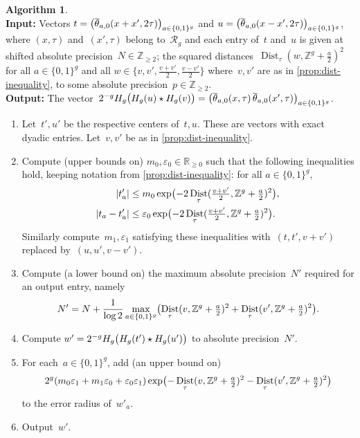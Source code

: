 \documentclass[12pt,oneside]{amsart}
\numberwithin{equation}{section}
\theoremstyle{definition}
\newtheorem{algorithm}[equation]{Algorithm}
\newcommand{\algoinput}[1]{~\\ \noindent\textbf{Input:} #1}
\newcommand{\algooutput}[1]{~\\ \noindent\textbf{Output:} #1}
\newcommand{\Z}{\mathbb{Z}}
\newcommand{\R}{\mathbb{R}}
\newcommand{\red}{\mathcal{R}}
\newcommand{\eps}{\varepsilon}
\DeclareMathOperator{\Dist}{Dist}
\DeclareMathOperator{\thetatilde}{\rlap{\raisebox{-0.1ex}{$\widetilde{\phantom{\,t}}$}}\theta}
\DeclarePairedDelimiter{\abs}{|}{|}
\DeclarePairedDelimiter{\paren}{(}{)}
\begin{document}
\begin{algorithm}
  \label{algo:hadamard}
  \algoinput{Vectors
    $t = \paren[\big]{\thetatilde_{a,0}(x+x',2\tau)}_{a\in \{0,1\}^g}$ and
    $u = \paren[\big]{\thetatilde_{a,0}(x-x',2\tau)}_{a\in \{0,1\}^g}$, where
    $(x,\tau)$ and~$(x',\tau)$ belong to~$\red_g$ and
    each entry of~$t$ and~$u$ is given at shifted absolute
    precision~$N \in \Z_{\geq 2}$; the squared
    distances~$\Dist_\tau(w, \Z^g + \tfrac a2)^2$ for all $a\in \{0,1\}^g$ and all
    $w\in \{v, v', \tfrac{v+v'}{2}, \tfrac{v-v'}{2}\}$ where~$v,v'$ are as in
    \cref{prop:dist-inequality}, to some absolute precision~$p\in \Z_{\geq 2}$.}
  \algooutput{The
    vector~$2^{-g}H_g\paren[\big]{H_g(u)\star H_g(v)} =
    \paren[\big]{\thetatilde_{a,0}(x,\tau)\thetatilde_{a,0}(x',\tau)}_{a\in
      \{0,1\}^g}$.}
  \begin{enumerate}
  \item Let~$t',u'$ be the respective centers of~$t,u$. These are vectors with
    exact dyadic entries. Let~$v,v'$ be as in \cref{prop:dist-inequality}.
  \item \label{step:hadamard-bounds} Compute (upper bounds on)
    $m_0,\eps_0\in \R_{\geq 0}$ such that the following inequalities hold,
    keeping notation from \cref{prop:dist-inequality}: for all
    $a\in \{0,1\}^g$,
    \begin{align*}
      \abs{t'_a} &\leq m_0 \exp\paren[\big]{-2\Dist_\tau(\tfrac{v+v'}{2}, \Z^g + \tfrac a2)^2}, \\
      \abs{t_a - t'_a} &\leq \eps_0 \exp\paren[\big]{-2\Dist_\tau(\tfrac{v+v'}{2}, \Z^g + \tfrac a2)^2}.
    \end{align*}
    Similarly compute~$m_1,\eps_1$ satisfying these inequalities
    with~$(t,t',v+v')$ replaced by~$(u,u',v-v')$.
  \item \label{step:hadamard-highprec} Compute (a lower bound on) the maximum
    absolute precision~$N'$ required for an output entry, namely
    \begin{displaymath}
      N' = N + \frac{1}{\log 2}\max_{a\in \{0,1\}^g} \paren[\big]{\Dist_\tau(v, \Z^g + \tfrac a2)^2 + \Dist_\tau(v', \Z^g + \tfrac a2)^2}.
    \end{displaymath}
  \item \label{step:hadamard} Compute
    $w' = 2^{-g} H_g\paren[\big]{H_g(t')\star H_g(u')}$ to absolute precision~$N'$.
  \item \label{step:hadamard-err} For each~$a\in\{0,1\}^g$, add (an upper bound on)
    \begin{displaymath}
      2^g(m_0\eps_1 + m_1\eps_0 + \eps_0\eps_1)\exp\paren[\big]{- \Dist_\tau(v, \Z^g + \tfrac a2)^2 - \Dist_\tau(v', \Z^g + \tfrac a2)^2}
    \end{displaymath}
    to the error radius of~$w'_a$.
  \item Output~$w'$.
  \end{enumerate}
\end{algorithm}
\end{document}
